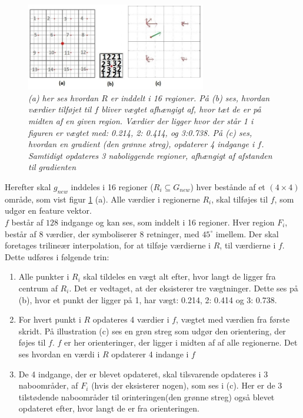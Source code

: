 \begin{figure}[H]
    \centering
    \includegraphics[width=0.70\textwidth]{fig/tilsift.jpg}
     \vspace{-1em}
    \begin{center}    
       \caption{{\footnotesize \textit{(a) her ses hvordan $R$ er inddelt i 16 regioner. På (b) ses, hvordan værdier tilføjet til $f$ bliver vægtet afhængigt af, hvor tæt de er på midten af en given region. Værdier der ligger hvor der står 1 i figuren er vægtet med: 0.214, 2: 0.414, og 3:0.738. På (c) ses, hvordan en gradient (den grønne streg), opdaterer 4 indgange i $f$. Samtidigt opdateres 3 naboliggende regioner, afhængigt af afstanden til gradienten}}}
    \label{trilinear}
     \end{center}
     \vspace{-2.5em}
  \end{figure} \noindent
Herefter skal $g_{new}$ inddeles i 16 regioner ($R_{i} \subseteq G_{new}$) hver bestånde af et $(4\times 4)$ område, som vist figur \ref{trilinear} (a). Alle værdier i regionerne $R_i$, skal tilføjes til $f$, som udgør en feature vektor.
\\
$f$ består af $128$ indgange og kan ses, som inddelt i 16 regioner. Hver region $F_i$, består af 8 værdier, der symboliserer 8 retninger, med $45^\circ$ imellem. Der skal foretages trilineær interpolation, for at tilføje værdierne i $R$, til værdierne i $f$. Dette udføres i følgende trin:
\begin{enumerate}
\item{Alle punkter i $R_{i}$ skal tildeles en vægt alt efter, hvor langt de ligger fra centrum af $R_{i}$. Det er vedtaget, at der eksisterer tre vægtninger. Dette ses på (b), hvor et punkt der ligger på  1, har vægt: 0.214, 2: 0.414 og 3: 0.738.}
\item{For hvert punkt i $R$ opdateres 4 værdier i $f$, vægtet med værdien fra første skridt. På illustration (c) ses en grøn streg som udgør den orientering, der føjes til $f$. $f$ er her orienteringer, der ligger i midten af af alle regionerne. Det ses hvordan en værdi i $R$ opdaterer 4 indange i $f$}
\item{De 4 indgange, der er blevet opdateret, skal tilsvarende opdateres i 3 naboområder, af $F_i$ (hvis der eksisterer nogen), som ses i (c). Her er de 3 tilstødende naboområder til orinteringen(den grønne streg) også blevet opdateret efter, hvor langt de er fra orienteringen.}
\end{enumerate}

